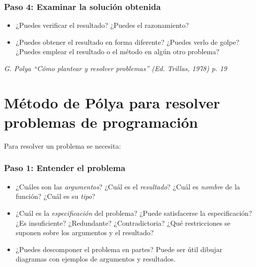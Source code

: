 \subsubsection*{Paso 4: Examinar la solución obtenida}
\begin{itemize}
\item ¿Puedes verificar el resultado? ¿Puedes el razonamiento?
\item ¿Puedes obtener el resultado en forma diferente? ¿Puedes verlo de golpe?
  ¿Puedes emplear el resultado o el método en algún otro problema? 
\end{itemize}

\noindent
\textit{G. Polya ``Cómo plantear y resolver problemas'' (Ed. Trillas, 1978)
  p. 19} 

\section{Método de Pólya para resolver problemas de programación}

\noindent Para resolver un problema se necesita:
\subsubsection*{Paso 1: Entender el problema}
\begin{itemize}
\item ¿Cuáles son las \emph{argumentos}? ¿Cuál es el \emph{resultado}? ¿Cuál es
  \emph{nombre} de la función? ¿Cuál es su \emph{tipo}?
\item ¿Cuál es la \emph{especificación} del problema? ¿Puede satisfacerse la
  especificación? ¿Es insuficiente? ¿Redundante? ¿Contradictoria? ¿Qué
  restricciones se suponen sobre los argumentos y el resultado?
\item ¿Puedes descomponer el problema en partes? Puede ser útil dibujar
  diagramas con ejemplos de argumentos y resultados.
\end{itemize}


